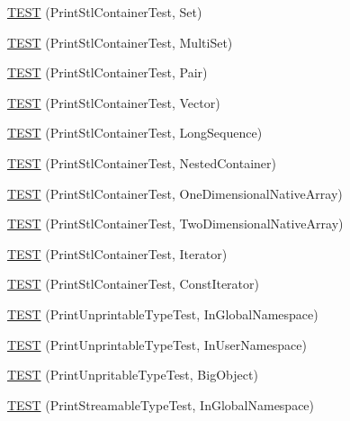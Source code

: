 \begin{DoxyCompactItemize}
\item 
\hyperlink{namespacetesting_1_1gtest__printers__test_abdc498462741033074f8e86b7c0bd480}{T\+E\+S\+T} (Print\+Stl\+Container\+Test, Set)
\item 
\hyperlink{namespacetesting_1_1gtest__printers__test_adaa3e1cfa3feca377b3958edb41fc0f1}{T\+E\+S\+T} (Print\+Stl\+Container\+Test, Multi\+Set)
\item 
\hyperlink{namespacetesting_1_1gtest__printers__test_ad5d3e873b00c1c9e3f5924e106dd7831}{T\+E\+S\+T} (Print\+Stl\+Container\+Test, Pair)
\item 
\hyperlink{namespacetesting_1_1gtest__printers__test_abfab1ea62f0285c0cdbcca500be0dac8}{T\+E\+S\+T} (Print\+Stl\+Container\+Test, Vector)
\item 
\hyperlink{namespacetesting_1_1gtest__printers__test_a55eca253f3365ad26183bcc711cb257a}{T\+E\+S\+T} (Print\+Stl\+Container\+Test, Long\+Sequence)
\item 
\hyperlink{namespacetesting_1_1gtest__printers__test_ad8fb463805baecdfb95154dec6ec4f27}{T\+E\+S\+T} (Print\+Stl\+Container\+Test, Nested\+Container)
\item 
\hyperlink{namespacetesting_1_1gtest__printers__test_a6dd59bbdea483f662fe62e2c55c106ce}{T\+E\+S\+T} (Print\+Stl\+Container\+Test, One\+Dimensional\+Native\+Array)
\item 
\hyperlink{namespacetesting_1_1gtest__printers__test_aca371c218e2248562ed258eaf385f4d1}{T\+E\+S\+T} (Print\+Stl\+Container\+Test, Two\+Dimensional\+Native\+Array)
\item 
\hyperlink{namespacetesting_1_1gtest__printers__test_a01ec32faf0032f9fbcf4895d8d6e4aa9}{T\+E\+S\+T} (Print\+Stl\+Container\+Test, Iterator)
\item 
\hyperlink{namespacetesting_1_1gtest__printers__test_a3b54f9a039804190b7ff2e818169c0f2}{T\+E\+S\+T} (Print\+Stl\+Container\+Test, Const\+Iterator)
\item 
\hyperlink{namespacetesting_1_1gtest__printers__test_a805264fd24de8e65cba977a798abc54c}{T\+E\+S\+T} (Print\+Unprintable\+Type\+Test, In\+Global\+Namespace)
\item 
\hyperlink{namespacetesting_1_1gtest__printers__test_a0aa1499e978bdde6c71e49ecc9db695b}{T\+E\+S\+T} (Print\+Unprintable\+Type\+Test, In\+User\+Namespace)
\item 
\hyperlink{namespacetesting_1_1gtest__printers__test_a6b6fba2a191094244f8aa78a4933a2c5}{T\+E\+S\+T} (Print\+Unpritable\+Type\+Test, Big\+Object)
\item 
\hyperlink{namespacetesting_1_1gtest__printers__test_a80fe9d71227a97b12fd5336a823c3d17}{T\+E\+S\+T} (Print\+Streamable\+Type\+Test, In\+Global\+Namespace)

\end{DoxyCompactItemize}
